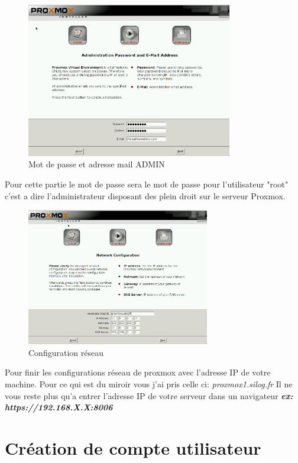 \documentclass[12pt,a4paper]{article}
\begin{document}
\begin{figure}[!ht]
\center
\includegraphics[width=9cm]{Images/5.PNG}  
\caption{Mot de passe et adresse mail ADMIN}
\end{figure}

\begin{center}
Pour cette partie le mot de passe sera le mot de passe pour l'utilisateur "root" c'est a dire l'administrateur disposant des plein droit sur le serveur Proxmox. 
\end{center}

\begin{figure}[!ht]
\center
\includegraphics[width=8cm]{Images/6.PNG}  
\caption{Configuration réseau}
\end{figure}

\begin{center}
Pour finir les configurations réseau de proxmox avec l'adresse IP de votre machine. Pour ce qui est du miroir vous j'ai pris celle ci: 
\textit{proxmox1.silog.fr} Il ne vous reste plus qu'a entrer l'adresse IP de votre serveur dans un navigateur 
\textbf{\textit{ex: https://192.168.X.X:8006}}
\end{center}

\newpage
\section{Création de compte utilisateur}
\end{document}
